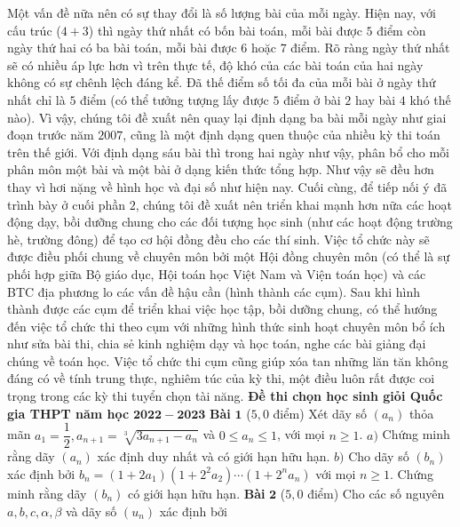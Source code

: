 \begin{multicols}{2}
	\vskip 0.05cm
	Một vấn đề nữa nên có sự thay đổi là số lượng bài của mỗi ngày. Hiện nay, với cấu trúc ($4+3$) thì ngày thứ nhất có bốn bài toán, mỗi bài được $5$ điểm còn ngày thứ hai có ba bài toán, mỗi bài được $6$ hoặc $7$ điểm. Rõ ràng ngày thứ nhất sẽ có nhiều áp lực hơn vì trên thực tế, độ khó của các bài toán của hai ngày không có sự chênh lệch đáng kể. Đã thế điểm số tối đa của mỗi bài ở ngày thứ nhất chỉ là $5$ điểm (có thể tưởng tượng lấy được $5$ điểm ở bài $2$ hay bài $4$ khó thế nào). Vì vậy, chúng tôi đề xuất nên quay lại định dạng ba bài mỗi ngày như giai đoạn trước năm $2007$, cũng là một định dạng quen thuộc của nhiều kỳ thi toán trên thế giới. Với định dạng sáu bài thì trong hai ngày như vậy, phân bổ cho mỗi phân môn một bài và một bài ở dạng kiến thức tổng hợp. Như vậy sẽ đều hơn thay vì hơi nặng về hình học và đại số như hiện nay. 
	\vskip 0.05cm
	Cuối cùng, để tiếp nối ý đã trình bày ở cuối phần $2$, chúng tôi đề xuất nên triển khai mạnh hơn nữa các hoạt động dạy, bồi dưỡng chung cho các đối tượng học sinh (như các hoạt động trường hè, trường đông) để tạo cơ hội đồng đều cho các thí sinh. Việc tổ chức này sẽ được điều phối chung về chuyên môn bởi một Hội đồng chuyên môn (có thể là sự phối hợp giữa Bộ giáo dục, Hội toán học Việt Nam và Viện toán học) và các BTC địa phương lo các vấn đề hậu cần (hình thành các cụm). 
	\vskip 0.05cm
	Sau khi hình thành được các cụm để triển khai việc học tập, bồi dưỡng chung, có thể hướng đến việc tổ chức thi theo cụm với những hình thức sinh hoạt chuyên môn bổ ích như sửa bài thi, chia sẻ kinh nghiệm dạy và học toán, nghe các bài giảng đại chúng về toán học. Việc tổ chức thi cụm cũng giúp xóa tan những lăn tăn không đáng có về tính trung thực, nghiêm túc của kỳ thi, một điều luôn rất được coi trọng trong các kỳ thi tuyển chọn tài năng. 
	\vskip 0.05cm
	\textbf{\color{cackithi}Đề thi chọn học sinh giỏi Quốc gia THPT năm học} $\pmb{2022-2023}$
	\vskip 0.05cm
	\textbf{\color{cackithi}Bài} $\pmb{1}$ ($5{,}0$ điểm) Xét dãy số $\left(a_n\right)$ thỏa mãn $a_1 = \dfrac{1}{2}, a_{n+1} = \sqrt[3]{3a_{n+1} - a_n}$ và $0 \le a_n \le 1$, với mọi $n \ge 1$.
	\vskip 0.05cm
	$a)$ Chứng minh rằng dãy $(a_n)$ xác định duy nhất và có giới hạn hữu hạn.
	\vskip 0.05cm
	$b)$ Cho dãy số $\left(b_n\right)$ xác định bởi $b_n = (1+ 2a_1)\left(1 + 2^2a_2\right)\cdots\left(1 + 2^na_n\right)$ với mọi $n \ge 1$. Chứng minh rằng dãy $\left(b_n\right)$ có giới hạn hữu hạn.
	\vskip 0.05cm
	\textbf{\color{cackithi}Bài} $\pmb{2}$ ($5{,}0$ điểm) Cho các số nguyên $a,b,c, \alpha,\beta$ và dãy số $\left(u_n\right)$ xác định bởi 
	\setlength{\abovedisplayskip}{4pt}

\end{multicols}
